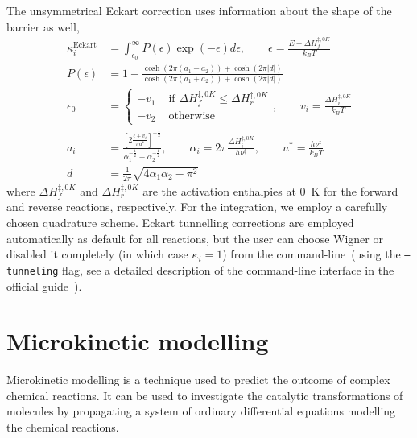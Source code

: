 The unsymmetrical Eckart correction uses information about the shape of the barrier as well,
% 
\begin{equation}
	\begin{split}
		\kappa_i^\text{Eckart}
		&= \int_{\epsilon_0}^\infty
		P(\epsilon) \exp \left(
		-\epsilon
		\right) d \epsilon,
		\qquad
		\epsilon
		= \frac{E - \Delta H^{\ddagger,
					0 K}_f}{k_B T} \\
		P(\epsilon)
		&= 1
		- \frac{
			\cosh \left(
			2 \pi (a_1 - a_2)
			\right)
			+ \cosh \left(
			2 \pi |d|
			\right)
		}{
			\cosh \left(
			2 \pi (a_1 + a_2)
			\right)
			+ \cosh \left(
			2 \pi |d|
			\right)
		} \\
		\epsilon_0 &= \begin{cases}
			-v_1 & \text{ if }
			\Delta H^{\ddagger,
					0 K}_f \le \Delta H^{\ddagger,
			0 K}_r                   \\
			-v_2 & \text{ otherwise}
		\end{cases},
		\qquad
		v_i
		= \frac{\Delta H^{\ddagger,
					0 K}_i}{k_B T} \\
		a_i
		&= \frac{
			\left[
				2
				\frac{
					\epsilon + v_i
				}{\pi u^*}
				\right]^{-\frac{1}{2}}
		}{
			\alpha_1^{-\frac{1}{2}}
			+ \alpha_2^{-\frac{1}{2}}
		},
		\qquad
		\alpha_i
		= 2 \pi \frac{
			\Delta H^{\ddagger,
					0 K}_i
		}{
			h \nu^\ddagger
		},
		\qquad
		u^*
		= \frac{
			h \nu^\ddagger
		}{
			k_B T
		} \\
		d
		&= \frac{1}{2 \pi}
		\sqrt{
			4 \alpha_1 \alpha_2 - \pi^2
		}
	\end{split}
\end{equation}
% 
where $\Delta H^{\ddagger,
			0 K}_f$ and $\Delta H^{\ddagger,
			0 K}_r$ are the activation enthalpies at 0~K for the forward and reverse reactions,
respectively.
For the integration,
we employ a carefully chosen quadrature scheme.
Eckart tunnelling corrections are employed automatically as default for all reactions,
but the user can choose Wigner or disabled it completely (in which case $\kappa_i = 1$)
from the command-line~(using the \texttt{--tunneling} flag,
see a detailed description of the command-line interface in the official guide~\cite{overreactguidecli2022}).

\section{Microkinetic modelling}%
\label{sec:microkinetic}

Microkinetic modelling is a technique used to predict the outcome of complex
chemical reactions.
It can be used to investigate the catalytic transformations of molecules by
propagating a system of ordinary differential equations modelling the chemical
reactions.

